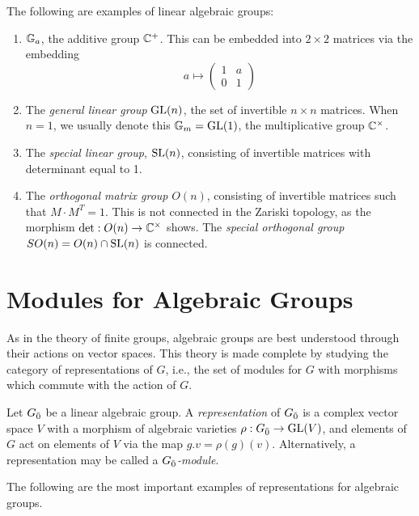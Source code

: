 \begin{example} \label{ex:lag}
  The following are examples of linear algebraic groups:
  \begin{enumerate}
  \item $\mathbb{G}_a$, the additive group $\mathbb{C}^+$. This can be embedded into $2 \times 2$ matrices via the embedding
    \[
      a \mapsto
      \begin{pmatrix}
        1 & a \\
        0 & 1
      \end{pmatrix}
    \]
  \item The \emph{general linear group} $\operatorname{GL}(n)$, the set of invertible $n \times n$ matrices. When $n = 1$, we usually denote this $\mathbb{G}_m = \operatorname{GL}(1)$, the multiplicative group $\mathbb{C}^\times$.
  \item The \emph{special linear group}, $\operatorname{SL}(n)$, consisting of invertible matrices with determinant equal to 1.
  \item The \emph{orthogonal matrix group} $O(n)$, consisting of invertible matrices such that $M \cdot M^T = 1$. This is not connected in the Zariski topology, as the morphism $\det: O(n) \to \mathbb{C}^\times$ shows. The \emph{special orthogonal group} $SO(n) = O(n) \cap \operatorname{SL}(n)$ is connected.
  \end{enumerate}
\end{example}

\section{Modules for Algebraic Groups}
\label{sec:group-modules}

As in the theory of finite groups, algebraic groups are best understood through their actions on vector spaces. This theory is made complete by studying the category of representations of $G$, i.e., the set of modules for $G$ with morphisms which commute with the action of $G$.

\begin{definition}
  Let ${G}_{\bar{0}}$ be a linear algebraic group. A \emph{representation} of ${G}_{\bar{0}}$ is a complex vector space $V$ with a morphism of algebraic varieties $\rho: {G}_{\bar{0}} \to \operatorname{GL}(V)$, and elements of $G$ act on elements of $V$ via the map $g.v = \rho(g)(v)$. Alternatively, a representation may be called a \emph{${G}_{\bar{0}}$-module}.
\end{definition}

The following are the most important examples of representations for algebraic groups.

